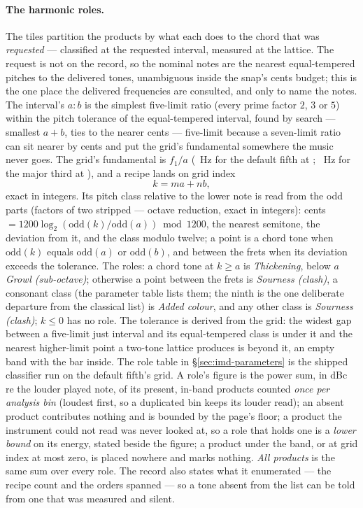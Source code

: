 \documentclass[11pt,a4paper]{article}
\begin{document}
\paragraph{The harmonic roles.}
The tiles partition the products by what each does to the chord that was
\emph{requested} --- classified at the requested interval, measured at the
lattice. The request is not on the record, so the nominal notes are the
nearest equal-tempered pitches to the delivered tones, unambiguous inside
the snap's cents budget; this is the one place the delivered frequencies
are consulted, and only to name the notes. The interval's 
$a : b$ is the simplest five-limit ratio (every prime factor $2$, $3$ or
$5$) within the pitch tolerance of the equal-tempered interval, found by
search --- smallest $a + b$, ties to the nearer cents --- five-limit
because a seven-limit ratio can sit nearer by cents and put the grid's
fundamental somewhere the music never goes. The grid's fundamental is
$f_1/a$ (\imdRoleGridHz\ Hz for the default fifth at \imdRoleRatio;
\imdThirdGridHz\ Hz for the major third at \imdThirdRatio), and a recipe
lands on grid index
\begin{equation}
  k = m a + n b,
  \label{eq:gridindex}
\end{equation}
exact in integers. Its pitch class relative to the lower note is read from
the odd parts (factors of two stripped --- octave reduction, exact in
integers): cents $= 1200\log_2(\mathrm{odd}(k)/\mathrm{odd}(a)) \bmod
1200$, the nearest semitone, the deviation from it, and the class modulo
twelve; a point is a chord tone when $\mathrm{odd}(k)$ equals
$\mathrm{odd}(a)$ or $\mathrm{odd}(b)$, and between the frets when its
deviation exceeds the tolerance. The roles: a chord tone at $k \ge a$ is
\emph{Thickening}, below $a$ \emph{Growl (sub-octave)}; otherwise a point
between the frets is \emph{Sourness (clash)}, a consonant class (the
parameter table lists them; the ninth is the one deliberate departure from
the classical list) is \emph{Added colour}, and any other class is
\emph{Sourness (clash)}; $k \le 0$ has no role. The tolerance is derived
from the grid: the widest gap between a five-limit just interval and its
equal-tempered class is under it and the nearest higher-limit point a
two-tone lattice produces is beyond it, an empty band with the bar inside.
The role table in \S\ref{sec:imd-parameters} is the shipped classifier
run on the default fifth's grid. A role's figure is the power sum, in dBc
re the louder played note, of its present, in-band products counted
\emph{once per analysis bin} (loudest first, so a duplicated bin keeps its
louder read); an absent product contributes nothing and is bounded by the
page's floor; a product the instrument could not read was never looked at,
so a role that holds one is a \emph{lower bound} on its energy, stated
beside the figure; a product under the band, or at grid index at most
zero, is placed nowhere and marks nothing. \emph{All products} is the
same sum over every role. The record also states what it enumerated ---
the recipe count and the orders spanned --- so a tone absent from the list
can be told from one that was measured and silent.
\end{document}
